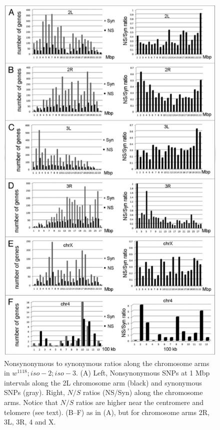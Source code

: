 \begin{figure}
    \centering
    \includegraphics[width=14cm]{snpeff_fig6.png}
    \caption{Nonsynonymous to synonymous ratios along the chromosome arms in $w^{1118} ; iso-2; iso-3$. (A) Left, Nonsynonymous SNPs at 1 Mbp intervals along the 2L chromosome arm (black) and synonymous SNPs (gray). Right, $N/S$ ratios (NS/Syn) along the chromosome arms. Notice that $N/S$ ratios are higher near the centromere and telomere (see text). (B–F) as in (A), but for chromosome arms 2R, 3L, 3R, 4 and X.}
    \label{fig:snpeffTab3}
\end{figure}

